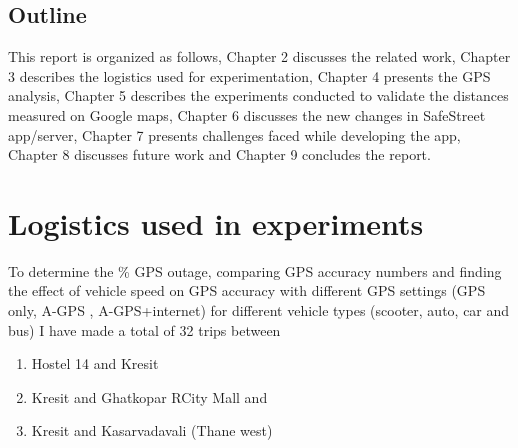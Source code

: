 \documentclass[12pt]{report}
\begin{document}







\section{Outline}
This report is organized as follows,
Chapter 2 discusses the related work,
Chapter 3 describes the logistics used for experimentation,
Chapter 4 presents the GPS analysis,
Chapter 5 describes the experiments conducted to validate the distances measured
on Google maps, 
Chapter 6 discusses the new changes in SafeStreet app/server,
Chapter 7 presents challenges faced while developing the app,
Chapter 8 discusses future work and Chapter 9 concludes the report.



% 


\chapter{Logistics used in experiments}


To determine the \% GPS outage, comparing GPS accuracy numbers and finding the
effect of vehicle speed on GPS accuracy with different GPS settings (GPS only,
A-GPS , A-GPS+internet) for different vehicle types (scooter, auto, car and bus)
I have made a total of 32 trips between

\begin{enumerate}
\item Hostel 14 and Kresit
\item Kresit and Ghatkopar RCity Mall and
\item Kresit and Kasarvadavali (Thane west)
\end{enumerate}
\end{document}
